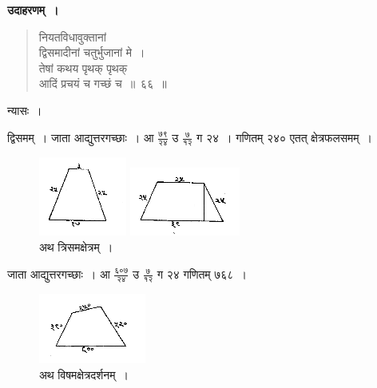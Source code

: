 \documentclass[11pt, openany]{book}
\begin{document}
\newpage%
 \textbf{उदाहरणम्~।} 
\begin{quote}
    \bqt 
नियतविधावुक्तानां \\
द्विसमादीनां चतुर्भुजानां मे~।\\
तेषां कथय पृथक् पृथक् \\
आदिं प्रचयं च गच्छं च~॥~६६~॥
\end{quote}

न्यासः~। \\
\vspace{-3mm}

 द्विसमम्~। जाता आद्युत्तरगच्छाः~। आ $\frac{\mbox{७९}}{\mbox{२४}}$ उ $\frac{\mbox{७}}{\mbox{१२}}$ ग २४~। गणितम् २४० एतत् क्षेत्रफलसमम्~। 
\vspace{-2mm}
 
\begin{figure}[h!]
    \centering
    \includegraphics[scale=0.85]{graphics/capture92.png}

    \captionsetup{labelformat=empty}
 \caption{अथ त्रिसमक्षेत्रम्~।}
 \includegraphics[scale=0.85]{graphics/capture93.png}
\end{figure}
\vspace{-2mm}

जाता आद्युत्तरगच्छाः~। आ $\frac{\mbox{६०७}}{\mbox{२४}}$ उ $\frac{\mbox{७}}{\mbox{१२}}$ ग २४ गणितम् ७६८~। 
\newpage
 
\begin{figure}[h!]
    \centering
     \captionsetup{labelformat=empty}
 \caption{अथ विषमक्षेत्रदर्शनम्~।}
\vspace{-2mm}
    \includegraphics[scale=0.85]{graphics/capture94.png}
\end{figure}
\vspace{-1mm}
\end{document}
